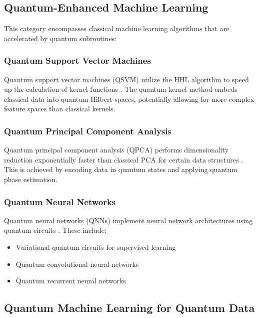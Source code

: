 \documentclass[12pt,a4paper]{article}
\begin{document}
\subsection{Quantum-Enhanced Machine Learning}

This category encompasses classical machine learning algorithms that are accelerated by quantum subroutines:

\subsubsection{Quantum Support Vector Machines}

Quantum support vector machines (QSVM) utilize the HHL algorithm to speed up the calculation of kernel functions \citep{Rebentrost2014}. The quantum kernel method embeds classical data into quantum Hilbert spaces, potentially allowing for more complex feature spaces than classical kernels.

\subsubsection{Quantum Principal Component Analysis}

Quantum principal component analysis (QPCA) performs dimensionality reduction exponentially faster than classical PCA for certain data structures \citep{Lloyd2014}. This is achieved by encoding data in quantum states and applying quantum phase estimation.

\subsubsection{Quantum Neural Networks}

Quantum neural networks (QNNs) implement neural network architectures using quantum circuits \citep{Farhi2018}. These include:

\begin{itemize}
    \item Variational quantum circuits for supervised learning
    \item Quantum convolutional neural networks
    \item Quantum recurrent neural networks
\end{itemize}

\subsection{Quantum Machine Learning for Quantum Data}
\end{document}
